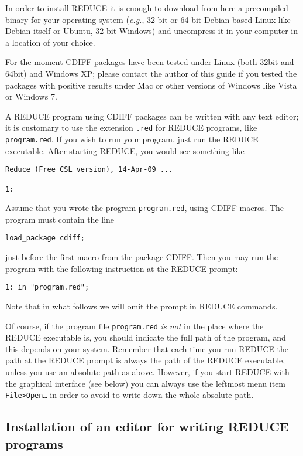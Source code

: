 \documentclass[12pt]{amsart}
\theoremstyle{definition}
\newcommand{\cdiff}{CDIFF\xspace}
\newcommand{\reduce}{REDUCE\xspace}
\begin{document}
In order to install \reduce it is enough to download from here \cite{red} a
precompiled binary for your operating system (\emph{e.g.}, 32-bit or 64-bit
Debian-based Linux like Debian itself or Ubuntu, 32-bit Windows) and uncompress
it in your computer in a location of your choice.

For the moment \cdiff packages have been tested under Linux (both 32bit and
64bit) and Windows XP; please contact the author of this guide if you tested
the packages with positive results under Mac or other versions of Windows like
Vista or Windows 7.

A \reduce program using \cdiff packages can be written with any text editor; it
is customary to use the extension \texttt{.red} for \reduce programs, like
\texttt{program.red}. If you wish to run your program, just run the \reduce
executable. After starting \reduce, you would see something like
\begin{verbatim}
Reduce (Free CSL version), 14-Apr-09 ...

1:
\end{verbatim}

Assume that you wrote the program \texttt{program.red}, using \cdiff macros.
The program must contain the line
\begin{verbatim}
load_package cdiff;
\end{verbatim}
just before the first macro from the package \cdiff.
Then you may run the program with the following instruction at the \reduce
prompt:
\begin{verbatim}
1: in "program.red";
 \end{verbatim}
Note that in what follows we will omit the prompt in \reduce commands.

Of course, if the program file \texttt{program.red} \emph{is not} in the place
where the \reduce executable is, you should indicate the full path of the
program, and this depends on your system.
Remember that each time you run \reduce the path at the \reduce prompt is always
the path of the \reduce executable, unless you use an absolute path as
above. However, if you start \reduce with the graphical interface (see below)
you can always use the leftmost menu item \texttt{File>Open\dots} in order to
avoid to write down the whole absolute path.

\subsection{Installation of an editor for writing \reduce programs}
\label{sec:inst-reduce-ide}
\end{document}
